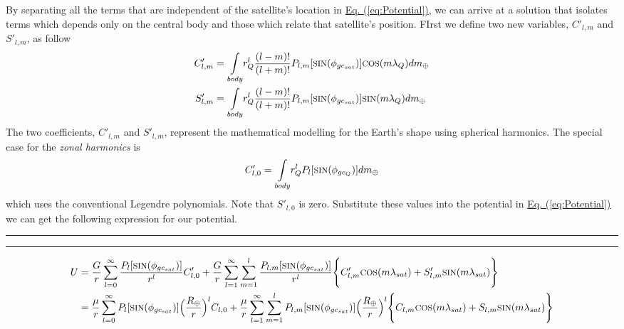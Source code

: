 \begin{multicols}{2}
By separating all the terms that are independent of the satellite's location in \hyperref[eq:Potential]{Eq. (\ref*{eq:Potential})}, we can arrive at a solution that isolates terms which depends only on the central body and those which relate that satellite's position. FIrst we define two new variables, $C'_{l,m}$ and $S'_{l,m}$, as follow
\begin{gather}
    \begin{split}
        C'_{l,m} &= \underset{body}{\int}r_Q^l\frac{(l-m)!}{(l+m)!}P_{l,m}[\text{\footnotesize{SIN}}(\phi_{gc_{sat}})]\text{\footnotesize{COS}}(m\lambda_Q)dm_\oplus\\
        S'_{l,m} &= \underset{body}{\int}r_Q^l\frac{(l-m)!}{(l+m)!}P_{l,m}[\text{\footnotesize{SIN}}(\phi_{gc_{sat}})]\text{\footnotesize{SIN}}(m\lambda_Q)dm_\oplus
    \end{split}
\end{gather}
The two coefficients, $C'_{l,m}$ and $S'_{l,m}$, represent the mathematical modelling for the Earth's shape using spherical harmonics. The special case for the \textit{zonal harmonics} is 
\begin{gather}
    C'_{l,0}=\underset{body}{\int}r_Q^lP_l[\text{\footnotesize{SIN}}(\phi_{gc_{Q}})]dm_\oplus
\end{gather}
which uses the conventional Legendre polynomials. Note that $S'_{l,0}$ is zero. Substitute these values into the potential in \hyperref[eq:Potential]{Eq. (\ref*{eq:Potential})} we can get the following expression for our potential. 
\end{multicols}
\par\noindent\rule{\dimexpr(0.5\columnsep-0.4pt)}{0.4pt}%
\rule{0.4pt}{6pt}

\begin{gather}
    \begin{split}
        U &= \frac{G}{r}\sum_{l=0}^{\infty}\frac{P_l[\text{\footnotesize{SIN}}(\phi_{gc_{sat}})]}{r^l}C'_{l,0}+\frac{G}{r}\sum_{l=1}^{\infty}\sum_{m=1}^{l}\frac{P_{l,m}[\text{\footnotesize{SIN}}(\phi_{gc_{sat}})]}{r^l}\Bigg\{ C'_{l,m}\text{\footnotesize{COS}}(m\lambda_{sat})+S'_{l,m}\text{\footnotesize{SIN}}(m\lambda_{sat})\Bigg\}\\
        &= \frac{\mu}{r}\sum_{l=0}^{\infty}P_l[\text{\footnotesize{SIN}}(\phi_{gc_{sat}})]\Big(\frac{R_\oplus}{r}\Big)^lC_{l,0} + \frac{\mu}{r}\sum_{l=1}^{\infty}\sum_{m=1}^{l}P_{l,m}[\text{\footnotesize{SIN}}(\phi_{gc_{sat}})]\Big(\frac{R_\oplus}{r}\Big)^l\Bigg\{C_{l,m}\text{\footnotesize{COS}}(m\lambda_{sat})+S_{l,m}\text{\footnotesize{SIN}}(m\lambda_{sat})\Bigg\}
    \end{split}
\end{gather}

